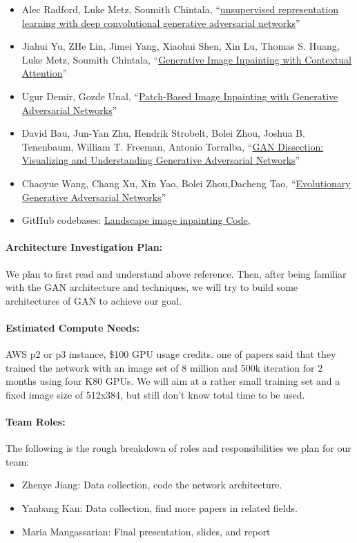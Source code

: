\documentclass[11pt]{article}
\begin{document}
\begin{itemize} 
\item Alec Radford, Luke Metz, Soumith Chintala, ``\href{https://arxiv.org/pdf/1511.06434.pdf}{unsupervised representation learning with deep convolutional generative adversarial networks}'' 
\item Jiahui Yu, ZHe Lin, Jimei Yang, Xiaohui Shen, Xin Lu, Thomas S. Huang, Luke Metz, Soumith Chintala, ``\href{http://openaccess.thecvf.com/content_cvpr_2018/papers/Yu_Generative_Image_Inpainting_CVPR_2018_paper.pdf}{Generative Image Inpainting with Contextual Attention}'' 
\item Ugur Demir, Gozde Unal, ``\href{https://arxiv.org/pdf/1803.07422.pdf}{Patch-Based Image Inpainting with Generative Adversarial Networks}'' 
\item David Bau, Jun-Yan Zhu, Hendrik Strobelt, Bolei Zhou, Joshua B. Tenenbaum, William T. Freeman, Antonio Torralba, ``\href{https://arxiv.org/pdf/1811.10597.pdf}{GAN Dissection: Visualizing and Understanding Generative Adversarial Networks}'' 
\item Chaoyue Wang,  Chang Xu, Xin Yao, Bolei Zhou,Dacheng Tao, ``\href{https://arxiv.org/pdf/1803.00657.pdf}{Evolutionary Generative Adversarial Networks}'' 

\item GitHub codebases: \href{https://github.com/tron32213021/ee599-GAN-Project} {Landscape image inpainting Code},  
\end{itemize} 


\paragraph{Architecture Investigation Plan:}  We plan to first read and understand above reference. Then, after being familiar with the GAN architecture and techniques, we will try to build some architectures of GAN to achieve our goal.

\paragraph{Estimated Compute Needs:}  AWS p2 or p3 instance, \$100 GPU usage credits. one of papers said that they trained the network with an image set of 8 million and 500k iteration for 2 months using four K80 GPUs. We will aim at a rather small training set and a fixed image size of 512x384, but still don't know total time to be used. 

\paragraph{Team Roles:} The following is the rough breakdown of roles and responsibilities we plan for our team:
\begin{itemize}
\item Zhenye Jiang: Data collection, code the network architecture.
\item Yanbang Kan: Data collection, find more papers in related fields.
\item Maria Mangassarian: Final presentation, slides, and report
\end{itemize}


 
\end{document}

